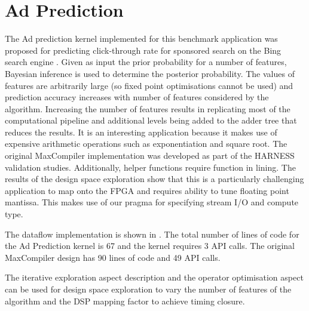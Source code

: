 \section{Ad Prediction}

The Ad prediction kernel implemented for this benchmark application
was proposed for predicting click-through rate for sponsored search on
the Bing search engine \cite{graepel2010web}. Given as input the prior
probability for a number of features, Bayesian inference is used to
determine the posterior probability. The values of features are
arbitrarily large (so fixed point optimisations cannot be used) and
prediction accuracy increases with number of features considered by
the algorithm. Increasing the number of features results in
replicating most of the computational pipeline and additional levels
being added to the adder tree that reduces the results. It is an
interesting application because it makes use of expensive arithmetic
operations such as exponentiation and square root. The original
MaxCompiler implementation was developed as part of the HARNESS
validation studies. Additionally, helper functions require function in
lining. The results of the design space exploration show that this is
a particularly challenging application to map onto the FPGA and
requires ability to tune floating point mantissa. This makes use of
our pragma for specifying stream I/O and compute type.

The \FAST{} dataflow implementation is shown in
.  The total number of lines of code for the
Ad Prediction kernel is 67 and the kernel requires 3 API calls. The
original MaxCompiler design has 90 lines of code and 49 API calls.


The iterative exploration aspect description and the operator
optimisation aspect can be used for design space exploration to vary
the number of features of the algorithm and the DSP mapping factor to
achieve timing closure.

